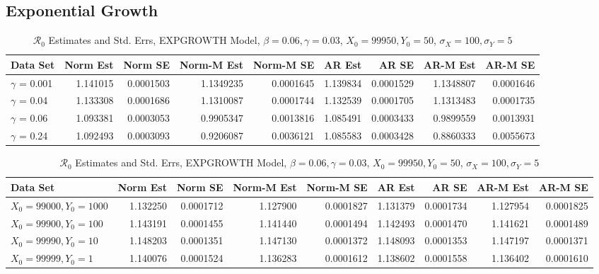 \documentclass[12pt]{article}
\newcommand{\rr}{\ensuremath{\mathcal{R}_0}}
\begin{document}
\subsection{Exponential Growth}

\begin{table}[H]
	
	\caption{\label{tab:}$\rr$ Estimates and Std. Errs, EXPGROWTH Model,
		$\beta = 0.06, \gamma = 0.03$, $X_0 = 99950, Y_0 = 50$, $\sigma_X = 100, \sigma_Y = 5$}
	\centering
	\begin{tabular}[t]{l|r|r|r|r|r|r|r|r}
		\hline
		Data Set & Norm Est & Norm SE & Norm-M Est & Norm-M SE & AR Est & AR SE & AR-M Est & AR-M SE\\
		\hline
		$\gamma$ = 0.001 & 1.141015 & 0.0001503 & 1.1349235 & 0.0001645 & 1.139834 & 0.0001529 & 1.1348807 & 0.0001646\\
		\hline
		$\gamma$ = 0.04 & 1.133308 & 0.0001686 & 1.1310087 & 0.0001744 & 1.132539 & 0.0001705 & 1.1313483 & 0.0001735\\
		\hline
		$\gamma$ = 0.06 & 1.093381 & 0.0003053 & 0.9905347 & 0.0013816 & 1.085491 & 0.0003433 & 0.9899559 & 0.0013931\\
		\hline
		$\gamma$ = 0.24 & 1.092493 & 0.0003093 & 0.9206087 & 0.0036121 & 1.085583 & 0.0003428 & 0.8860333 & 0.0055673\\
		\hline
	\end{tabular}
\end{table}

\begin{table}[H]
	
	\caption{\label{tab:}$\rr$ Estimates and Std. Errs, EXPGROWTH Model,
		$\beta = 0.06, \gamma = 0.03$, $X_0 = 99950, Y_0 = 50$, $\sigma_X = 100, \sigma_Y = 5$}
	\centering
	\begin{tabular}[t]{l|r|r|r|r|r|r|r|r}
		\hline
		Data Set & Norm Est & Norm SE & Norm-M Est & Norm-M SE & AR Est & AR SE & AR-M Est & AR-M SE\\
		\hline
		$X_0 = 99000, Y_0 = 1000$ & 1.132250 & 0.0001712 & 1.127900 & 0.0001827 & 1.131379 & 0.0001734 & 1.127954 & 0.0001825\\
		\hline
		$X_0 = 99900, Y_0 = 100$ & 1.143191 & 0.0001455 & 1.141440 & 0.0001494 & 1.142493 & 0.0001470 & 1.141621 & 0.0001489\\
		\hline
		$X_0 = 99990, Y_0 = 10$ & 1.148203 & 0.0001351 & 1.147130 & 0.0001372 & 1.148093 & 0.0001353 & 1.147197 & 0.0001371\\
		\hline
		$X_0 = 99999, Y_0 = 1$& 1.140076 & 0.0001524 & 1.136283 & 0.0001612 & 1.138602 & 0.0001558 & 1.136402 & 0.0001610\\
		\hline
	\end{tabular}
\end{table}
\end{document}
